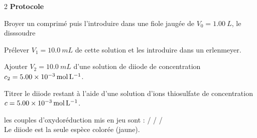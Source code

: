 \documentclass[a4paper,10pt,fleqn]{scrartcl}%
\begin{document}
\begin{multicols}{2}
\textbf{Protocole}
    \begin{itemize*}
        \item Broyer un comprimé puis l'introduire dans une fiole jaugée de $V_0 = \SI{1,00}{L}$, le disssoudre
        \item Prélever $V_1 = \SI{10,0}{mL}$ de cette solution et les introduire dans un erlenmeyer.
        \item Ajouter $V_2 = \SI{10,0}{mL}$ d'une solution de diiode  de concentration $c_2 = \SI{5,00E-3}{\mole\per\liter}$.
        \item Titrer le diiode restant à l'aide d'une solution d'ions thiosulfate  de concentration $c=\SI{5,00E-3}{\mole\per\liter}$.
    \end{itemize*}

les couples d'oxydoréduction mis en jeu sont : 
/ \hspace{1em} / \hspace{1em} /\\
Le diiode est la seule espèce colorée (jaune).


\end{multicols}
\end{document}
